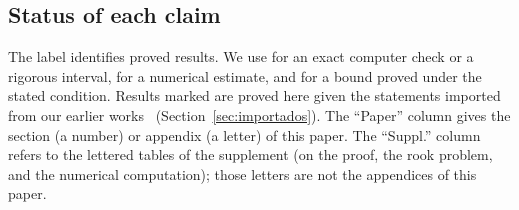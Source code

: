 \subsection{Status of each claim}\label{sec:claim-ledger}
The label  identifies proved results. We use  for an exact computer check or a
rigorous interval,  for a numerical estimate, and  for a bound proved under the
stated condition. Results marked  are proved here given the
statements imported from our earlier works~\cite{pv,ef,pc,tc} (Section~\ref{sec:importados}). The
“Paper” column gives the section (a number) or appendix (a letter)
of this paper. The “Suppl.” column refers
to the lettered tables of the supplement (on the proof, the rook problem, and the numerical
computation); those letters are not the appendices of this paper.

